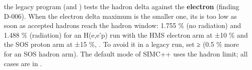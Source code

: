 \begin{simclegacy}
the legacy program (and ) tests the hadron delta against the \textbf{electron}
\hyperref[param:SPedgeu25eu25deltau25max]{} (finding D-006). When the electron delta maximum is the smaller one, its  is too low as
soon as accepted hadrons reach the hadron window: 1.755 \% (no radiation) and 1.488 \% (radiation) for an H(e,e'p) run
with the HMS electron arm at ±10 \% and the SOS proton arm at ±15 \%, . To avoid it in a legacy run, set
\hyperref[param:SPedgeu25eu25deltau25max]{} ≥ \hyperref[param:SPedgeu25pu25deltau25max]{} (0.5 \% more for an SOS hadron arm). The default mode of SIMC++ uses the
hadron limit; all cases are in .
\end{simclegacy}
